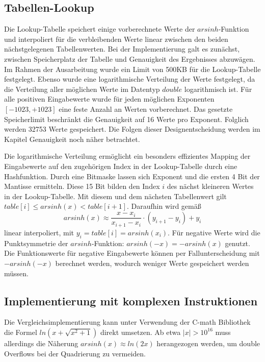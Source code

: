 \documentclass[course=erap] {aspdoc}
\begin{document}
    \subsection{Tabellen-Lookup}
    Die Lookup-Tabelle speichert einige vorberechnete Werte der $arsinh$-Funktion und interpoliert für die verbleibenden Werte linear zwischen den beiden nächstgelegenen Tabellenwerten.
    Bei der Implementierung galt es zunächst, zwischen Speicherplatz der Tabelle und Genauigkeit des Ergebnisses abzuwägen.
    Im Rahmen der Ausarbeitung wurde ein Limit von 500KB für die Lookup-Tabelle festgelegt.
    Ebenso wurde eine logarithmische Verteilung der Werte festgelegt, da die Verteilung aller möglichen Werte im Datentyp $double$ logarithmisch ist.
    Für alle positiven Eingabewerte wurde für jeden möglichen Exponenten $[-1023, +1023]$ eine feste Anzahl an Werten vorberechnet.
    Das gesetzte Speicherlimit beschränkt die Genauigkeit auf 16 Werte pro Exponent.
    Folglich werden 32753 Werte gespeichert.
    Die Folgen dieser Designentscheidung werden im Kapitel Genauigkeit noch näher betrachtet.

    Die logarithmische Verteilung ermöglicht ein besonders effizientes Mapping der Eingabewerte auf den zugehörigen Index in der Lookup-Tabelle durch eine Hashfunktion.
    Durch eine Bitmaske lassen sich Exponent und die ersten 4 Bit der Mantisse ermitteln.
    Diese 15 Bit bilden den Index $i$ des nächst kleineren Wertes in der Lookup-Tabelle.
    Mit diesem und dem nächsten Tabellenwert gilt $table[i] \leq arsinh(x) < table[i+1]$.
    Daraufhin wird gemäß
    \[
        arsinh(x) \approx \frac{x-x_i}{x_{i+1} - x_i}\cdot (y_{i+1}-y_i) + y_i
    \]
    linear interpoliert, mit $y_i = table[i] = arsinh(x_i)$.
    Für negative Werte wird die Punktsymmetrie der $arsinh$-Funktion: $arsinh(-x) = -arsinh(x)$ genutzt\cite{properties}.
    Die Funktionswerte für negative Eingabewerte können per Fallunterscheidung mit $-arsinh(-x)$ berechnet werden, wodurch weniger Werte gespeichert werden müssen.

    \subsection{Implementierung mit komplexen Instruktionen}
    Die Vergleichsimplementierung kann unter Verwendung der C-math Bibliothek die Formel $ln(x+\sqrt{x^2+1})$ direkt umsetzen.
    Ab etwa $|x|>10^{16}$ muss allerdings die Näherung $arsinh(x)\approx ln(2x)$ herangezogen werden, um double Overflows bei der Quadrierung zu vermeiden.
\end{document}
